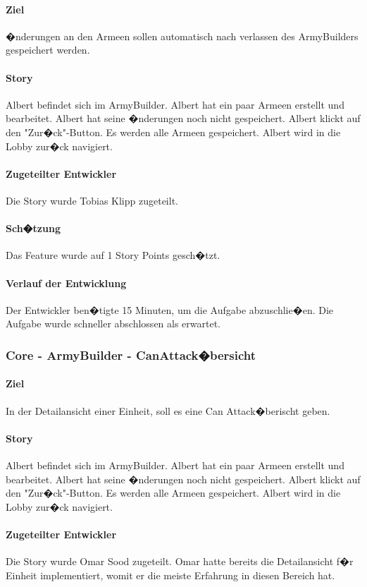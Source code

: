 \documentclass[12pt, titlepage]{scrartcl}
\begin{document}
			\paragraph{Ziel} �nderungen an den Armeen sollen automatisch nach verlassen des ArmyBuilders gespeichert werden.
			\paragraph{Story} Albert befindet sich im ArmyBuilder. Albert hat ein paar Armeen erstellt und bearbeitet. Albert hat seine �nderungen noch nicht gespeichert. Albert klickt auf den "Zur�ck"-Button. Es werden alle Armeen gespeichert. Albert wird in die Lobby zur�ck navigiert.
			\paragraph{Zugeteilter Entwickler} Die Story wurde Tobias Klipp zugeteilt.
			\paragraph{Sch�tzung}
			Das Feature wurde auf 1 Story Points gesch�tzt.
			\paragraph{Verlauf der Entwicklung} 
			Der Entwickler ben�tigte 15 Minuten, um die Aufgabe abzuschlie�en. Die Aufgabe wurde schneller abschlossen als erwartet.
			\subsubsection{Core - ArmyBuilder - \glqq CanAttack\grqq �bersicht}
			\paragraph{Ziel} In der Detailansicht einer Einheit, soll es eine \glqq Can Attack\grqq �berischt geben.
			\paragraph{Story} Albert befindet sich im ArmyBuilder. Albert hat ein paar Armeen erstellt und bearbeitet. Albert hat seine �nderungen noch nicht gespeichert. Albert klickt auf den "Zur�ck"-Button. Es werden alle Armeen gespeichert. Albert wird in die Lobby zur�ck navigiert.
			\paragraph{Zugeteilter Entwickler} Die Story wurde Omar Sood zugeteilt. Omar hatte bereits die Detailansicht f�r Einheit implementiert, womit er die meiste Erfahrung in diesen Bereich hat.
\end{document}
